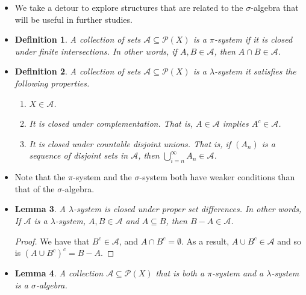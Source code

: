 \documentclass[10pt]{article}
\newtheorem{lemma}{Lemma}
\newtheorem{definition}[lemma]{Definition}
\newcommand{\mcal}[1]{\mathcal{#1}}
\begin{document}
\begin{itemize}
  \item We take a detour to explore structures that are related to the $\sigma$-algebra that will be useful in further studies.
  
  \item \begin{definition}
    A collection of sets $\mcal{A} \subseteq \mcal{P}(X)$ is a $\pi$-system if it is closed under finite intersections. In other words, if $A, B \in \mcal{A}$, then $A \cap B \in \mcal{A}$.
  \end{definition}

  \item \begin{definition}
    A collection of sets $\mcal{A} \subseteq \mcal{P}(X)$ is a $\lambda$-system it satisfies the following properties.
    \begin{enumerate}
      \item $X \in \mcal{A}$.
      \item It is closed under complementation. That is, $A \in \mcal{A}$ implies $A^c \in \mcal{A}$.
      \item It is closed under countable disjoint unions. That is, if $(A_n)$ is a sequence of disjoint sets in $\mcal{A}$, then $\bigcup_{i=n}^\infty A_n \in \mcal{A}$.
    \end{enumerate}
  \end{definition}

  \item Note that the $\pi$-system and the $\sigma$-system both have weaker conditions than that of the $\sigma$-algebra.  
  
  \item \begin{lemma} \label{lemma:lambda-closure-under-proper-differences}
    A $\lambda$-system is closed under proper set differences. In other words, 
    If $\mcal{A}$ is a $\lambda$-system, $A, B \in \mcal{A}$ and $A \subseteq B$, then $B-A \in \mcal{A}$.
  \end{lemma}

  \begin{proof}
    We have that $B^c \in \mcal{A}$, and $A \cap B^c = \emptyset$. As a result, $A \cup B^c \in \mcal{A}$ and so is $(A \cup B^c)^c = B-A$.
  \end{proof}

  \item \begin{lemma}
    A collection $\mcal{A} \subseteq \mcal{P}(X)$ that is both a $\pi$-system and a $\lambda$-system is a $\sigma$-algebra.
  \end{lemma}


\end{itemize}
\end{document}
